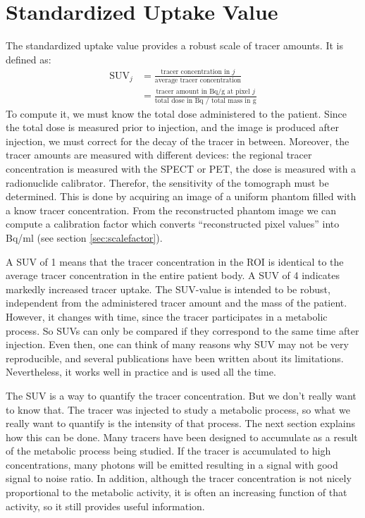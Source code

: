 \documentclass[11pt,oneside]{book}
\begin{document}
\section{Standardized Uptake Value}
The standardized uptake value provides a robust scale of tracer amounts. It is
defined as:
\begin{align}
  \mbox{SUV}_j &= \frac{\mbox{tracer concentration in $j$}}
                          {\mbox{average tracer concentration}}\\
  &= \frac{\mbox{tracer amount in Bq/g at pixel $j$}}
                      {\mbox{total dose in Bq / total mass in g}}
\end{align}
To compute it, we must know the total dose administered to the patient. Since
the total dose is measured prior to injection, and the image is produced after
injection, we must correct for the decay of the tracer in between. Moreover,
the tracer amounts are measured with different devices: the regional tracer
concentration is measured with the SPECT or PET, the dose is measured with a
radionuclide calibrator. Therefor, the sensitivity of the tomograph must be
determined. This is done by acquiring an image of a uniform phantom filled
with a know tracer concentration. From the reconstructed phantom image we can
compute a calibration factor which converts ``reconstructed pixel values''
into Bq/ml (see section \ref{sec:scalefactor}).

A SUV of 1 means that the tracer concentration in the ROI is identical
to the average tracer concentration in the entire patient body. A SUV
of 4 indicates markedly increased tracer uptake. The SUV-value is
intended to be robust, independent from the administered tracer amount
and the mass of the patient. However, it changes with time, since the
tracer participates in a metabolic process. So SUVs can only be
compared if they correspond to the same time after injection. Even
then, one can think of many reasons why SUV may not be very
reproducible, and several publications have been written about its
limitations.  Nevertheless, it works well in practice and is used all
the time.

The SUV is a way to quantify the tracer concentration. But we don't really
want to know that. The tracer was injected to study a metabolic process, so
what we really want to quantify is the intensity of that process. The next
section explains how this can be done. Many tracers have been designed to
accumulate as a result of the metabolic process being studied. If the tracer
is accumulated to high concentrations, many photons will be emitted resulting
in a signal with good signal to noise ratio. In addition, although the tracer
concentration is not nicely proportional to the metabolic activity, it is
often an increasing function of that activity, so it still provides useful
information.
\end{document}
